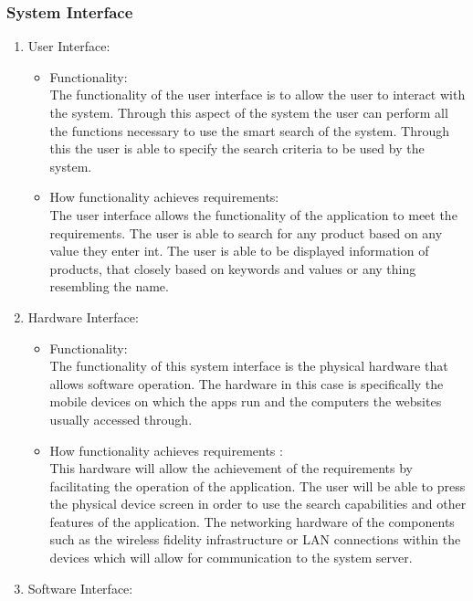 \documentclass[a4paper,10pt]{article}
\begin{document}
        \subsubsection{System Interface}{
			\begin{enumerate} 
				\item User Interface:
					\begin{itemize}
				\item Functionality:\\
					The functionality of the user interface is to allow the user to interact with the system. Through this aspect of the system the user can perform all the functions necessary to use the smart search of the system. Through this the user is able to specify the search criteria to be used by the system.\\
				\item How functionality achieves requirements:\\	
					The user interface allows the functionality of the application to meet the requirements. The user is able to search for any product based on any value they enter int. The user is able to be displayed information of products, that closely based on keywords and values or any thing resembling the name. \\
					\end{itemize}
				\item Hardware Interface:
					\begin{itemize}
					\item Functionality:\\
					The functionality of this system interface is the physical hardware that allows software operation. The hardware in this case is specifically the mobile devices on which the apps run and the computers the websites usually accessed through.\\
				\item How functionality achieves requirements :\\
					This hardware will allow the achievement of the requirements by facilitating the operation of the application. The user will be able to press the physical device screen in order to use the search capabilities and other features of the application. The networking hardware of the components such as the wireless fidelity infrastructure or LAN connections within the devices which will allow for communication to the system server.
				\end{itemize}
				\item Software Interface:

\end{enumerate}}
\end{document}
